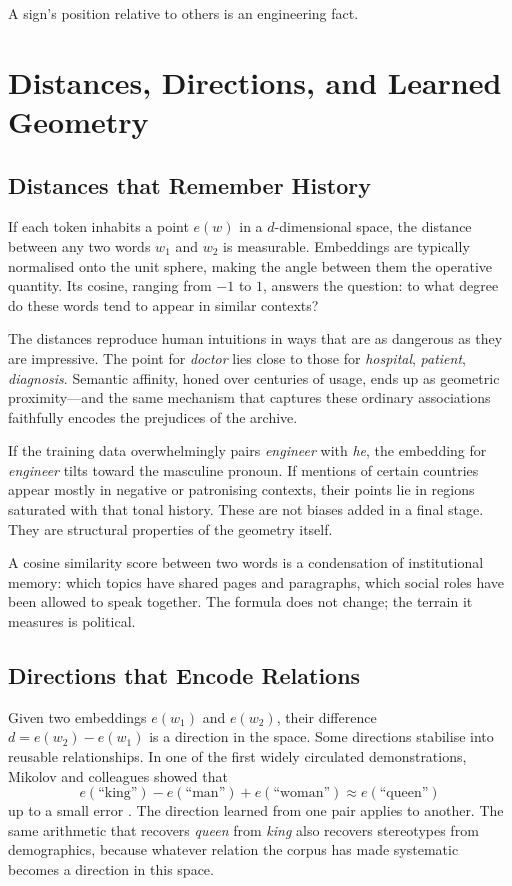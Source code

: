 \documentclass[12pt,a4paper]{article}
\begin{document}
A sign's position relative to others is an engineering fact.

\section{Distances, Directions, and Learned Geometry}

\subsection{Distances that Remember History}

If each token inhabits a point $e(w)$ in a $d$-dimensional space, the distance between any two words $w_1$ and $w_2$ is measurable. Embeddings are typically normalised onto the unit sphere, making the angle between them the operative quantity. Its cosine, ranging from $-1$ to $1$, answers the question: to what degree do these words tend to appear in similar contexts?

The distances reproduce human intuitions in ways that are as dangerous as they are impressive. The point for \emph{doctor} lies close to those for \emph{hospital}, \emph{patient}, \emph{diagnosis}. Semantic affinity, honed over centuries of usage, ends up as geometric proximity---and the same mechanism that captures these ordinary associations faithfully encodes the prejudices of the archive.

If the training data overwhelmingly pairs \emph{engineer} with \emph{he}, the embedding for \emph{engineer} tilts toward the masculine pronoun. If mentions of certain countries appear mostly in negative or patronising contexts, their points lie in regions saturated with that tonal history. These are not biases added in a final stage. They are structural properties of the geometry itself.

A cosine similarity score between two words is a condensation of institutional memory: which topics have shared pages and paragraphs, which social roles have been allowed to speak together. The formula does not change; the terrain it measures is political.

\subsection{Directions that Encode Relations}

Given two embeddings $e(w_1)$ and $e(w_2)$, their difference $d = e(w_2) - e(w_1)$ is a direction in the space. Some directions stabilise into reusable relationships. In one of the first widely circulated demonstrations, Mikolov and colleagues showed that
\[
e(\text{``king''}) - e(\text{``man''}) + e(\text{``woman''}) \approx e(\text{``queen''})
\]
up to a small error \cite{mikolov2013efficient}. The direction learned from one pair applies to another. The same arithmetic that recovers \emph{queen} from \emph{king} also recovers stereotypes from demographics, because whatever relation the corpus has made systematic becomes a direction in this space.
\end{document}
